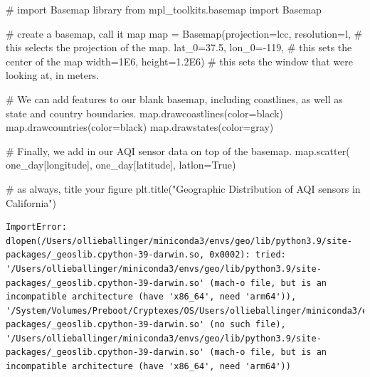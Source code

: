 \documentclass[
  letterpaper,
  DIV=11,
  numbers=noendperiod]{scrreprt}
\newenvironment{Shaded}{\begin{snugshade}}{\end{snugshade}}
\newcommand{\BuiltInTok}[1]{\textcolor[rgb]{0.00,0.23,0.31}{#1}}
\newcommand{\CommentTok}[1]{\textcolor[rgb]{0.37,0.37,0.37}{#1}}
\newcommand{\DecValTok}[1]{\textcolor[rgb]{0.68,0.00,0.00}{#1}}
\newcommand{\FloatTok}[1]{\textcolor[rgb]{0.68,0.00,0.00}{#1}}
\newcommand{\ImportTok}[1]{\textcolor[rgb]{0.00,0.46,0.62}{#1}}
\newcommand{\NormalTok}[1]{\textcolor[rgb]{0.00,0.23,0.31}{#1}}
\newcommand{\OperatorTok}[1]{\textcolor[rgb]{0.37,0.37,0.37}{#1}}
\newcommand{\StringTok}[1]{\textcolor[rgb]{0.13,0.47,0.30}{#1}}
\newcommand{\VariableTok}[1]{\textcolor[rgb]{0.07,0.07,0.07}{#1}}
\begin{document}
\begin{Shaded}
\begin{Highlighting}[]
\CommentTok{\# import Basemap library}
\ImportTok{from}\NormalTok{ mpl\_toolkits.basemap }\ImportTok{import}\NormalTok{ Basemap}

\CommentTok{\# create a basemap, call it \textquotesingle{}map\textquotesingle{}}
\BuiltInTok{map} \OperatorTok{=}\NormalTok{ Basemap(projection}\OperatorTok{=}\StringTok{\textquotesingle{}lcc\textquotesingle{}}\NormalTok{, resolution}\OperatorTok{=}\StringTok{\textquotesingle{}l\textquotesingle{}}\NormalTok{, }\CommentTok{\# this selects the projection of the map.}
\NormalTok{            lat\_0}\OperatorTok{=}\FloatTok{37.5}\NormalTok{, lon\_0}\OperatorTok{={-}}\DecValTok{119}\NormalTok{, }\CommentTok{\# this sets the center of the map }
\NormalTok{            width}\OperatorTok{=}\FloatTok{1E6}\NormalTok{, height}\OperatorTok{=}\FloatTok{1.2E6}\NormalTok{) }\CommentTok{\# this sets the window that we\textquotesingle{}re looking at, in meters.}

\CommentTok{\# We can add features to our blank basemap, including coastlines, as well as state and country boundaries. }
\BuiltInTok{map}\NormalTok{.drawcoastlines(color}\OperatorTok{=}\StringTok{\textquotesingle{}black\textquotesingle{}}\NormalTok{)}
\BuiltInTok{map}\NormalTok{.drawcountries(color}\OperatorTok{=}\StringTok{\textquotesingle{}black\textquotesingle{}}\NormalTok{)}
\BuiltInTok{map}\NormalTok{.drawstates(color}\OperatorTok{=}\StringTok{\textquotesingle{}gray\textquotesingle{}}\NormalTok{)}

\CommentTok{\# Finally, we add in our AQI sensor data on top of the basemap.}
\BuiltInTok{map}\NormalTok{.scatter(}
\NormalTok{    one\_day[}\StringTok{\textquotesingle{}longitude\textquotesingle{}}\NormalTok{], }
\NormalTok{    one\_day[}\StringTok{\textquotesingle{}latitude\textquotesingle{}}\NormalTok{], }
\NormalTok{    latlon}\OperatorTok{=}\VariableTok{True}\NormalTok{)}

\CommentTok{\# as always, title your figure}
\NormalTok{plt.title(}\StringTok{"Geographic Distribution of AQI sensors in California"}\NormalTok{)}
\end{Highlighting}
\end{Shaded}

\begin{verbatim}
ImportError: dlopen(/Users/ollieballinger/miniconda3/envs/geo/lib/python3.9/site-packages/_geoslib.cpython-39-darwin.so, 0x0002): tried: '/Users/ollieballinger/miniconda3/envs/geo/lib/python3.9/site-packages/_geoslib.cpython-39-darwin.so' (mach-o file, but is an incompatible architecture (have 'x86_64', need 'arm64')), '/System/Volumes/Preboot/Cryptexes/OS/Users/ollieballinger/miniconda3/envs/geo/lib/python3.9/site-packages/_geoslib.cpython-39-darwin.so' (no such file), '/Users/ollieballinger/miniconda3/envs/geo/lib/python3.9/site-packages/_geoslib.cpython-39-darwin.so' (mach-o file, but is an incompatible architecture (have 'x86_64', need 'arm64'))
\end{verbatim}
\end{document}

